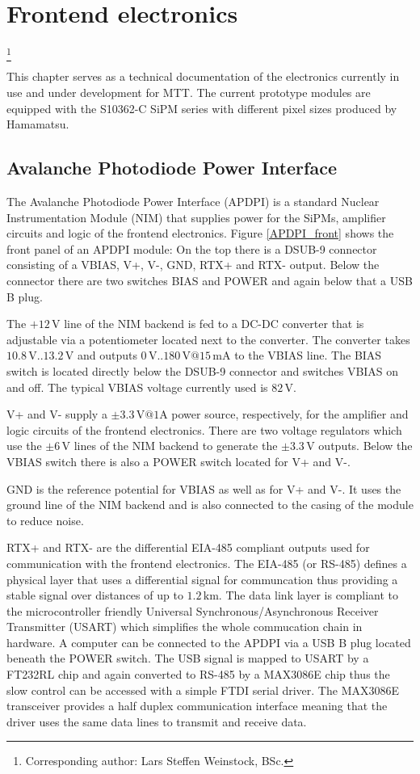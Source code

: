\documentclass[]{article}
\begin{document}
\newpage
\section{Frontend electronics }
	\footnote{Corresponding author: Lars Steffen Weinstock, BSc.}
	\label{sec:FEelectronics}

This chapter serves as a technical documentation of the electronics currently in use and under development for MTT. The current prototype modules are equipped with the S10362-C SiPM series with different pixel sizes produced by Hamamatsu. 

\subsection{Avalanche Photodiode Power Interface}

The Avalanche Photodiode Power Interface (APDPI) is a standard Nuclear Instrumentation Module (NIM) that supplies power for the SiPMs, amplifier circuits and logic of the frontend electronics.
Figure \ref{APDPI_front} shows the front panel of an APDPI module: On the top there is a DSUB-9 connector consisting of a VBIAS, V+, V-, GND, RTX+ and RTX- output.
Below the connector there are two switches BIAS and POWER and again below that a USB B plug.

The $+12\,\text{V}$ line of the NIM backend is fed to a DC-DC converter that is adjustable via a potentiometer located next to the converter.
The converter takes $10.8\,\text{V} .. 13.2\,\text{V}$ and outputs $0\,\text{V} .. 180\,\text{V}@15\,\text{mA}$ to the VBIAS line. The BIAS switch is located directly below the
DSUB-9 connector and switches VBIAS on and off. The typical VBIAS voltage currently used is $82\,\text{V}$.

V+ and V- supply a $\pm3.3\,\text{V}@1\text{A}$ power source, respectively, for the amplifier and logic circuits of the frontend electronics. There are two voltage regulators 
which use the $\pm6\,\text{V}$ lines of the NIM backend to generate the $\pm3.3\,\text{V}$ outputs. Below the VBIAS switch there is also a POWER switch located for V+ and V-.

GND is the reference potential for VBIAS as well as for V+ and V-. It uses the ground line of the NIM backend and is also connected to the casing of the 
module to reduce noise.

RTX+ and RTX- are the differential EIA-485 compliant outputs used for communication with the frontend electronics. The EIA-485 (or RS-485) 
defines a physical layer that uses a differential signal for communcation thus providing a stable signal over distances of up to $1.2\,\text{km}$. The data link layer is 
compliant to the microcontroller friendly Universal Synchronous/Asynchronous Receiver Transmitter (USART) which simplifies the whole commucation chain in hardware. 
A computer can be connected to the APDPI via a USB B plug located beneath the POWER switch. The USB signal is mapped to USART by a FT232RL
chip and again converted to RS-485 by a MAX3086E chip thus the slow control can be accessed with a simple 
FTDI serial driver.
The MAX3086E transceiver provides a half duplex communication interface meaning that the driver uses the same data lines to transmit and receive data.
\end{document}
